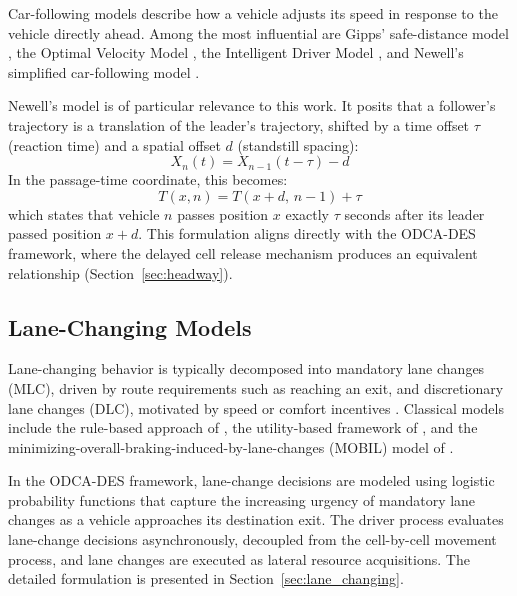 \documentclass[review,number]{elsarticle} %
\begin{document}
Car-following models describe how a vehicle adjusts its speed in response to the vehicle directly ahead. Among the most influential are Gipps' safe-distance model \citep{gipps1981behavioural}, the Optimal Velocity Model \citep{bando1995dynamical}, the Intelligent Driver Model \citep{treiber2000congested}, and Newell's simplified car-following model \citep{newell2002simplified}.

Newell's model is of particular relevance to this work. It posits that a follower's trajectory is a translation of the leader's trajectory, shifted by a time offset $\tau$ (reaction time) and a spatial offset $d$ (standstill spacing):
\begin{equation}
    X_{n}(t) = X_{n-1}(t - \tau) - d
    \label{eq:newell_cf}
\end{equation}
In the passage-time coordinate, this becomes:
\begin{equation}
    T(x, n) = T(x + d,\, n-1) + \tau
    \label{eq:newell_cf_Txn}
\end{equation}
which states that vehicle $n$ passes position $x$ exactly $\tau$ seconds after its leader passed position $x + d$. This formulation aligns directly with the ODCA-DES framework, where the delayed cell release mechanism produces an equivalent relationship (Section~\ref{sec:headway}).

\subsection{Lane-Changing Models}
\label{sec:lit_lc}

Lane-changing behavior is typically decomposed into mandatory lane changes (MLC), driven by route requirements such as reaching an exit, and discretionary lane changes (DLC), motivated by speed or comfort incentives \citep{zheng2014recent}. Classical models include the rule-based approach of \citet{gipps1986model}, the utility-based framework of \citet{toledo2003modeling}, and the minimizing-overall-braking-induced-by-lane-changes (MOBIL) model of \citet{kesting2007general}.

In the ODCA-DES framework, lane-change decisions are modeled using logistic probability functions that capture the increasing urgency of mandatory lane changes as a vehicle approaches its destination exit. The driver process evaluates lane-change decisions asynchronously, decoupled from the cell-by-cell movement process, and lane changes are executed as lateral resource acquisitions. The detailed formulation is presented in Section~\ref{sec:lane_changing}.
\end{document}
